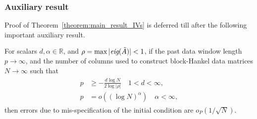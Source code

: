 \subsubsection{Auxiliary result}
Proof of Theorem~\ref{theorem:main_result_IVs} is deferred till after the following important auxiliary result.
\setcounter{thm}{0}
\begin{lem}\label{lem:relative_rates}\citep{Chiuso2006}
    For scalars $d,\alpha\in\mathbb{R}$, and ${\rho=\max|\emph{eig}(\tilde{A})|<1}$, if the past data window length ${p\rightarrow\infty}$, and the number of columns used to construct block-Hankel data matrices $N\rightarrow\infty$ such that%
    \begin{align}\label{eq:relative_rates}
        \begin{split}
            p &\geq -\frac{d\log N}{2\log|\rho|} \quad 1 < d < \infty,\\
            p&=o((\log N)^\alpha) \quad \alpha < \infty,%
        \end{split}
    \end{align}
    then errors due to mis-specification of the initial condition are $o_P(1/\sqrt{N})$.
\end{lem}

